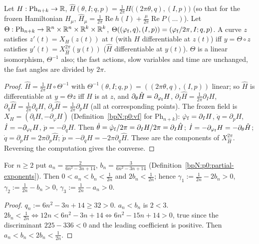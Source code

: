 \begin{lemma}\label{bpN:p11:orbit}
Let $H:\mathrm{Ph}_{n+k}\to\mathbb{R}$, $\hat H(\theta,I;q,p)=\frac1{2\pi}H\bigl((2\pi\theta,q),(I,p)\bigr)$ (so that for the frozen Hamiltonian $H_\mu$, $\hat H_\mu=\frac1{2\pi}\operatorname{Re}h(I)+\frac\mu{2\pi}\operatorname{Re}P(\ldots)$). Let $\Theta:\mathrm{Ph}_{n+k}\to\mathbb{R}^n\times\mathbb{R}^n\times\mathbb{R}^k\times\mathbb{R}^k$, $\Theta((\varphi_{\rm f},q),(I,p))=(\varphi_{\rm f}/2\pi,I;q,p)$. A curve $z$ satisfies $z'(t)=X_H(z(t))$ at $t$ (with $H$ differentiable at $z(t)$) iff $y=\Theta\circ z$ satisfies $y'(t)=X^{2\pi}_{\hat H}(y(t))$ ($\hat H$ differentiable at $y(t)$). $\Theta$ is a linear isomorphism, $\Theta^{-1}$ also; the fast actions, slow variables and time are unchanged, the fast angles are divided by $2\pi$.
\end{lemma}
\begin{proof}
\label{stepN:p11:or-chain} $\hat H=\frac1{2\pi}H\circ\Theta^{-1}$ with $\Theta^{-1}(\theta,I;q,p)=((2\pi\theta,q),(I,p))$ linear; so $\hat H$ is differentiable at $y=\Theta z$ iff $H$ is at $z$, and $\partial_\theta\hat H=\partial_{\varphi_{\rm f}}H$, $\partial_I\hat H=\frac1{2\pi}\partial_IH$, $\partial_q\hat H=\frac1{2\pi}\partial_qH$, $\partial_p\hat H=\frac1{2\pi}\partial_pH$ (all at corresponding points).
\label{stepN:p11:or-eq} The frozen field is $X_H=(\partial_{\mathsf I}H,-\partial_\varphi H)$ (Definition~\ref{bpN:p0:vf} for $\mathrm{Ph}_{n+k}$): $\dot\varphi_{\rm f}=\partial_IH$, $\dot q=\partial_pH$, $\dot I=-\partial_{\varphi_{\rm f}}H$, $\dot p=-\partial_qH$. Then $\dot\theta=\dot\varphi_{\rm f}/2\pi=\partial_IH/2\pi=\partial_I\hat H$; $\dot I=-\partial_{\varphi_{\rm f}}H=-\partial_\theta\hat H$; $\dot q=\partial_pH=2\pi\partial_p\hat H$; $\dot p=-\partial_qH=-2\pi\partial_q\hat H$. These are the components of $X^{2\pi}_{\hat H}$. Reversing the computation gives the converse.
\end{proof}

\begin{lemma}[Exponents]\label{bpN:p11:exponents}
For $n\ge2$ put $a_n=\frac2{6n^2-3n+14}$, $b_n=\frac3{6n^2-3n+14}$ (Definition~\ref{bpN:p0:partial-exponents}). Then $0<a_n<b_n<\frac1{2n}$ and $2b_n<\frac1{2n}$; hence $\gamma_1:=\frac1{2n}-2b_n>0$, $\gamma_2:=\frac1{2n}-b_n>0$, $\gamma_3:=\frac1{2n}-a_n>0$.
\end{lemma}
\begin{proof}
\label{stepN:p11:ex-den} $q_n:=6n^2-3n+14\ge32>0$. $a_n<b_n$ is $2<3$.
\label{stepN:p11:ex-cmp} $2b_n<\frac1{2n}\iff12n<6n^2-3n+14\iff6n^2-15n+14>0$, true since the discriminant $225-336<0$ and the leading coefficient is positive. Then $a_n<b_n<2b_n<\frac1{2n}$.
\end{proof}

